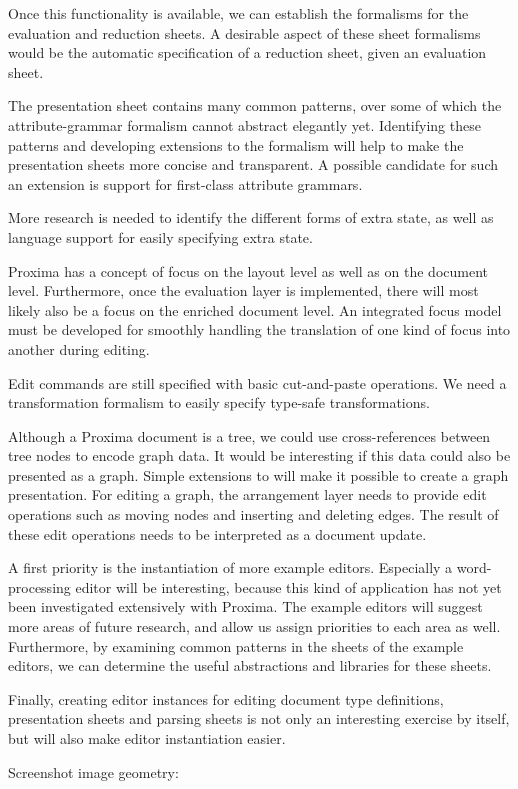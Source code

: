 Once this functionality is available, we can establish the formalisms for the evaluation and reduction sheets. A desirable aspect of these sheet formalisms would be the automatic specification of a reduction sheet, given an evaluation sheet.

 The presentation sheet contains many common patterns, over some of which the attribute-grammar formalism cannot abstract elegantly yet. Identifying these patterns and developing extensions to the formalism will help  to make the presentation sheets more concise and transparent. A possible candidate for such an extension is support for first-class attribute grammars.

 More research is needed to identify the different forms of extra state, as well as language support for easily specifying extra state.

 Proxima has a concept of focus on the layout level as well as on the document level. Furthermore, once the evaluation layer is implemented, there will most likely also be a focus on the enriched document level. An integrated focus model must be developed for smoothly handling the translation of one kind of focus into another during editing.

 Edit commands are still specified with basic cut-and-paste operations. We need a transformation formalism to easily specify type-safe transformations.

 Although a Proxima document is a tree, we could use cross-references between tree nodes to encode graph data. It would be interesting if this data could also be presented as a graph. Simple extensions to {\Xprez} will make it possible to create a graph presentation. For editing a graph, the arrangement layer needs to provide edit operations such as moving nodes and inserting and deleting edges. The result of these edit operations needs to be interpreted as a document update.

\bigskip
A first priority is the instantiation of more example editors. Especially a word-processing editor will be interesting, because this kind of application has not yet been investigated extensively with Proxima. The example editors will suggest more areas of future research, and allow us assign priorities to each area as well. Furthermore, by examining common patterns in the sheets of the example editors, we can determine the useful abstractions and libraries for these sheets.

Finally, creating editor instances for editing document type definitions, presentation sheets and parsing sheets is not only an interesting exercise by itself, but will also make editor instantiation easier.



\bc

Screenshot image geometry:



\ec